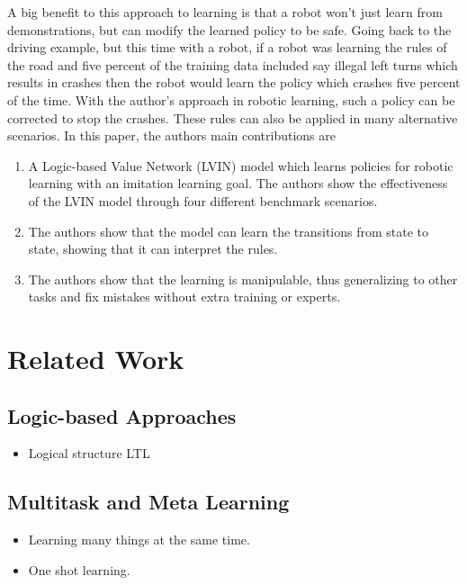 \documentclass[letterpaper, 10 pt, conference]{ieeeconf}  %
\begin{document}
\indent A big benefit to this approach to learning is that a robot won't just learn from demonstrations, but can modify the learned policy to be safe. Going back to the driving example, but this time with a robot, if a robot was learning the rules of the road and five percent of the training data included say illegal left turns which results in crashes then the robot would learn the policy which crashes five percent of the time. With the author's approach in robotic learning, such a policy can be corrected to stop the crashes. These rules can also be applied in many alternative scenarios. 
\newline
\indent In this paper, the authors main contributions are
\begin{enumerate}
  \item A Logic-based Value Network (LVIN) model which learns policies for robotic learning with an imitation learning goal. The authors show the effectiveness of the LVIN model through four different benchmark scenarios.
  \item The authors show that the model can learn the transitions from state to state, showing that it can interpret the rules.
  \item  The authors show that the learning is manipulable, thus generalizing to other tasks and fix mistakes without extra training or experts.
\end{enumerate}

\section{Related Work}

\subsection{Logic-based Approaches}

\begin{itemize}
  \item Logical structure LTL
\end{itemize}

\subsection{Multitask and Meta Learning}

\begin{itemize}
  \item Learning many things at the same time.
  \item One shot learning.
\end{itemize}
\end{document}

